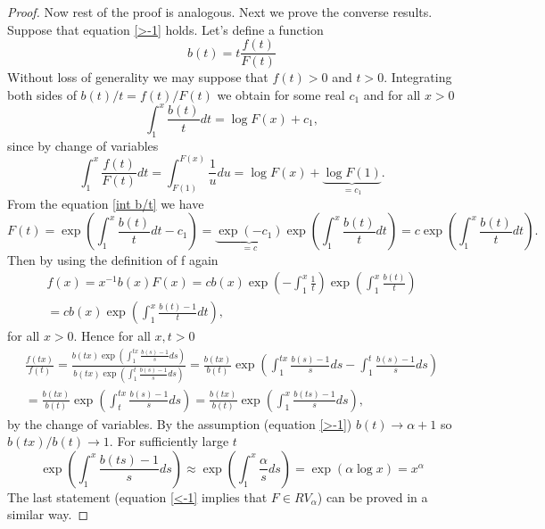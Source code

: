 \documentclass[english,12pt,a4paper,pdftex,sci,utf8]{aaltothesis} %
\begin{document}
\begin{proof}
Now rest of the proof is analogous. Next we prove the converse results. Suppose that equation \eqref{>-1} holds. Let's define a function
\begin{equation*}
b(t) = t\frac{f(t)}{F(t)}
\end{equation*}
Without loss of generality we may suppose that $f(t)>0$ and $t>0$. Integrating both sides of $b(t)/t=f(t)/F(t)$ we obtain for some real $c_1$ and for all $x>0$
\begin{equation}
\int_{1}^{x} \frac{b(t)}{t}dt = \log F(x) + c_1,
\label{int b/t}
\end{equation}
since by change of variables
\begin{equation*}
\int_{1}^{x} \frac{f(t)}{F(t)}dt = \int_{F(1)}^{F(x)} \frac{1}{u}du = \log F(x) + \underbrace{\log F(1)}_{=c_1}.
\end{equation*}
From the equation \eqref{int b/t} we have
\begin{equation*}
F(t) = \exp \left( \int_1^x \frac{b(t)}{t}dt-c_1 \right) =\underbrace{\exp(-c_1)}_{=c} \exp \left( \int_1^x \frac{b(t)}{t}dt\right) =c \exp \left( \int_1^x \frac{b(t)}{t}dt\right).
\end{equation*}
Then by using the definition of f again
\begin{equation}
\begin{split}
f(x)=x^{-1}b(x)F(x)=cb(x)\exp \left( -\int_1^x \frac{1}{t} \right) \exp \left( \int_1^x \frac{b(t)}{t} \right)\\
=cb(x)\exp \left( \int_1^x \frac{b(t)-1}{t}dt\right),
\label{frep}
\end{split}
\end{equation}
for all $x>0$. Hence for all $x,t>0$
\begin{equation*}
\begin{split}
\frac{f(tx)}{f(t)}=\frac{b(tx)\exp \left( \int_1^{tx} \frac{b(s)-1}{s}ds\right)}{b(tx)\exp \left( \int_1^{t} \frac{b(s)-1}{s}ds\right)} = \frac{b(tx)}{b(t)} \exp \left( \int_1^{tx} \frac{b(s)-1}{s}ds - \int_1^{t} \frac{b(s)-1}{s}ds\right) \\
= \frac{b(tx)}{b(t)} \exp \left( \int_{t}^{tx} \frac{b(s)-1}{s}ds\right)
= \frac{b(tx)}{b(t)} \exp \left( \int_{1}^{x} \frac{b(ts)-1}{s}ds\right),
\end{split}
\end{equation*}
by the change of variables. By the assumption (equation \eqref{>-1}) $b(t) \rightarrow \alpha + 1$ so $b(tx)/b(t) \rightarrow 1$. For sufficiently large $t$
\begin{equation*}
\exp \left( \int_{1}^{x} \frac{b(ts)-1}{s}ds\right) \approx \exp \left( \int_{1}^{x} \frac{\alpha}{s}ds\right)=\exp \left(\alpha \log x \right) = x^{\alpha}
\end{equation*}
The last statement (equation \eqref{<-1} implies that $F \in RV_{\alpha}$) can be proved in a similar way.
\end{proof}
\end{document}
